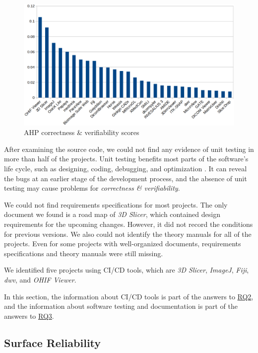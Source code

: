 \documentclass[3p, 12pt,authoryear]{elsarticle}
\begin{document}
\begin{figure}[ht]
\includegraphics[scale=0.38]{figures/correctness_verifiability_scores.png}
\caption{AHP correctness \& verifiability scores}
\label{fg_correctness_erifiability_scores}
\end{figure}

After examining the source code, we could not find any evidence of unit testing
in more than half of the projects. Unit testing benefits most parts of the
software's life cycle, such as designing, coding, debugging, and optimization
\citep{Hamill2004}. It can reveal the bugs at an earlier stage of the development
process, and the absence of unit testing may cause problems for
\textit{correctness \& verifiability}.

We could not find requirements specifications for most projects. The only
document we found is a road map of \textit{3D Slicer}, which contained design
requirements for the upcoming changes. However, it did not record the conditions
for previous versions. We also could not identify the theory manuals for all of
the projects. Even for some projects with well-organized documents, requirements
specifications and theory manuals were still missing.

We identified five projects using CI/CD tools, which are \textit{3D Slicer},
\textit{ImageJ}, \textit{Fiji}, \textit{dwv}, and \textit{OHIF Viewer}.

In this section, the information about CI/CD tools is part of the answers to
\hyperlink{rq2}{RQ2}, and the information about software testing and
documentation is part of the answers to \hyperlink{rq3}{RQ3}.

\subsection{Surface Reliability} \label{sec_result_reliability}
\end{document}
